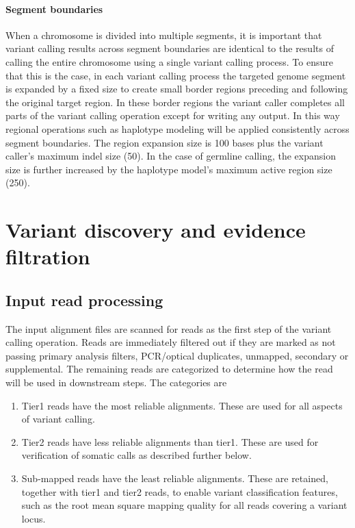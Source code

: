 \documentclass{article}
\begin{document}
\paragraph{Segment boundaries} When a chromosome is divided into multiple segments, it is important that variant calling results across segment boundaries are identical to the results of calling the entire chromosome using a single variant calling process. To ensure that this is the case, in each variant calling process the targeted genome segment is expanded by a fixed size to create small border regions preceding and following the original target region. In these border regions the variant caller completes all parts of the variant calling operation except for writing any output. In this way regional operations such as haplotype modeling will be applied consistently across segment boundaries. The region expansion size is 100 bases plus the variant caller's maximum indel size (50). In the case of germline calling, the expansion size is further increased by the haplotype model's maximum active region size (250).


\section{Variant discovery and evidence filtration}

\subsection{Input read processing}

The input alignment files are scanned for reads as the first step of the variant calling operation. Reads are immediately filtered out if they are marked as not passing primary analysis filters, PCR/optical duplicates, unmapped, secondary or supplemental. The remaining reads are categorized to determine how the read will be used in downstream steps. The categories are
\begin{enumerate}
    \item Tier1 reads have the most reliable alignments. These are used for all aspects of variant calling.
    \item Tier2 reads have less reliable alignments than tier1. These are used for verification of somatic calls as described further below.
    \item Sub-mapped reads have the least reliable alignments. These are retained, together with tier1 and tier2 reads, to enable  variant classification features, such as the root mean square mapping quality for all reads covering a variant locus.
\end{enumerate}
\end{document}
